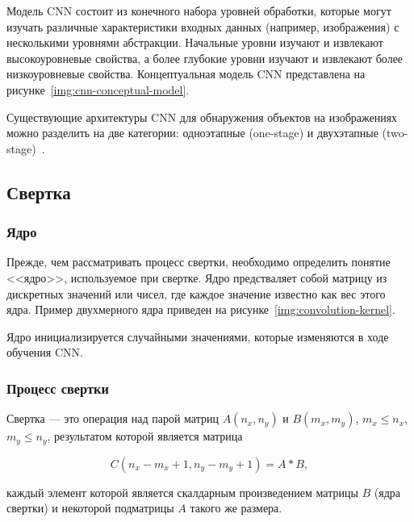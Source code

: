 Модель CNN состоит из конечного набора уровней обработки, которые могут изучать различные характеристики входных данных (например, изображения) с несколькими уровнями абстракции. Начальные уровни изучают и извлекают высокоуровневые свойства, а более глубокие уровни изучают и извлекают более низкоуровневые свойства. Концептуальная модель CNN представлена на рисунке~\ref{img:cnn-conceptual-model}.


Существующие архитектуры CNN для обнаружения объектов на изображениях можно разделить на две категории: одноэтапные (one-stage) и двухэтапные (two-stage)~\cite{review-on-one-stage-object-detection}.    

\subsection{Свертка}

\subsubsection*{Ядро}

Прежде, чем рассматривать процесс свертки, необходимо определить понятие <<ядро>>, используемое при свертке. Ядро предстваляет собой матрицу из дискретных значений или чисел, где каждое значение известно как вес этого ядра. Пример двухмерного ядра приведен на рисунке~\ref{img:convolution-kernel}.


Ядро инициализируется случайными значениями, которые изменяются в ходе обучения CNN.

\subsubsection*{Процесс свертки}

Свертка --- это операция над парой матриц $A(n_x, n_y)$ и $B(m_x, m_y)$, $m_x  \le n_x$, $m_y \le n_y$, результатом которой является матрица 

\begin{equation}
C(n_x - m_x +1, n_y - m_y + 1) = A * B,
\end{equation}

каждый элемент которой является скалдарным произведением матрицы $B$ (ядра свертки) и некоторой подматрицы $A$ такого же размера.

